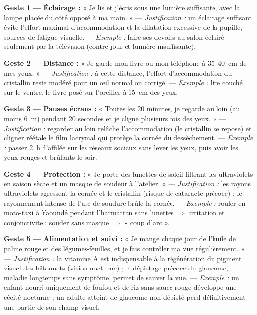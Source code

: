 \documentclass[11pt]{article}
\begin{document}
\begin{corrige}
\textbf{Geste 1 — Éclairage :} « Je lis et j'écris sous une lumière suffisante, avec la lampe placée du côté opposé à ma main. » --- \emph{Justification :} un éclairage suffisant évite l'effort maximal d'accommodation et la dilatation excessive de la pupille, sources de fatigue visuelle. --- \emph{Exemple :} faire ses devoirs au salon éclairé seulement par la télévision (contre-jour et lumière insuffisante).

\textbf{Geste 2 — Distance :} « Je garde mon livre ou mon téléphone à 35--40~cm de mes yeux. » --- \emph{Justification :} à cette distance, l'effort d'accommodation du cristallin reste modéré pour un œil normal ou corrigé. --- \emph{Exemple :} lire couché sur le ventre, le livre posé sur l'oreiller à 15~cm des yeux.

\textbf{Geste 3 — Pauses écrans :} « Toutes les 20 minutes, je regarde au loin (au moins 6~m) pendant 20 secondes et je cligne plusieurs fois des yeux. » --- \emph{Justification :} regarder au loin relâche l'accommodation (le cristallin se repose) et cligner réétale le film lacrymal qui protège la cornée du dessèchement. --- \emph{Exemple :} passer 2~h d'affilée sur les réseaux sociaux sans lever les yeux, puis avoir les yeux rouges et brûlants le soir.

\textbf{Geste 4 — Protection :} « Je porte des lunettes de soleil filtrant les ultraviolets en saison sèche et un masque de soudeur à l'atelier. » --- \emph{Justification :} les rayons ultraviolets agressent la cornée et le cristallin (risque de cataracte précoce) ; le rayonnement intense de l'arc de soudure brûle la cornée. --- \emph{Exemple :} rouler en moto-taxi à Yaoundé pendant l'harmattan sans lunettes $\Rightarrow$ irritation et conjonctivite ; souder sans masque $\Rightarrow$ « coup d'arc ».

\textbf{Geste 5 — Alimentation et suivi :} « Je mange chaque jour de l'huile de palme rouge et des légumes-feuilles, et je fais contrôler ma vue régulièrement. » --- \emph{Justification :} la vitamine A est indispensable à la régénération du pigment visuel des bâtonnets (vision nocturne) ; le dépistage précoce du glaucome, maladie longtemps sans symptôme, permet de sauver la vue. --- \emph{Exemple :} un enfant nourri uniquement de foufou et de riz sans sauce rouge développe une cécité nocturne ; un adulte atteint de glaucome non dépisté perd définitivement une partie de son champ visuel.
\end{corrige}
\end{document}
